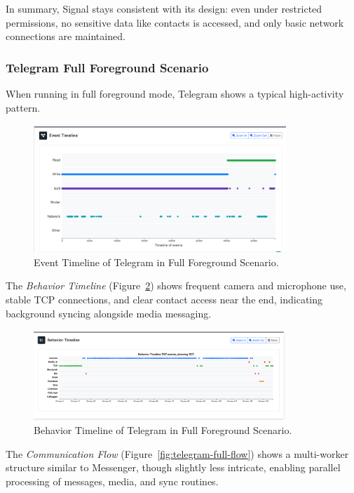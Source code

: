 \documentclass[a4paper,12pt]{report}
\begin{document}
In summary, Signal stays consistent with its design: even under restricted permissions, no sensitive data like contacts is accessed, and only basic network connections are maintained.



\subsubsection{Telegram Full Foreground Scenario}

When running in full foreground mode, Telegram shows a typical high-activity pattern.

\begin{figure}[H]
    \centering
    \includegraphics[width=0.85\textwidth]{telegram-full-events.png}
    \caption{Event Timeline of Telegram in Full Foreground Scenario.}
    \label{fig:telegram-full-events}
\end{figure}

The \textit{Behavior Timeline} (Figure~\ref{fig:telegram-full-behav}) shows frequent camera and microphone use, stable TCP connections, and clear contact access near the end, indicating background syncing alongside media messaging.

\begin{figure}[H]
    \centering
    \includegraphics[width=0.85\textwidth]{telegram-full-behav.png}
    \caption{Behavior Timeline of Telegram in Full Foreground Scenario.}
    \label{fig:telegram-full-behav}
\end{figure}

The \textit{Communication Flow} (Figure~\ref{fig:telegram-full-flow}) shows a multi-worker structure similar to Messenger, though slightly less intricate, enabling parallel processing of messages, media, and sync routines.
\end{document}
